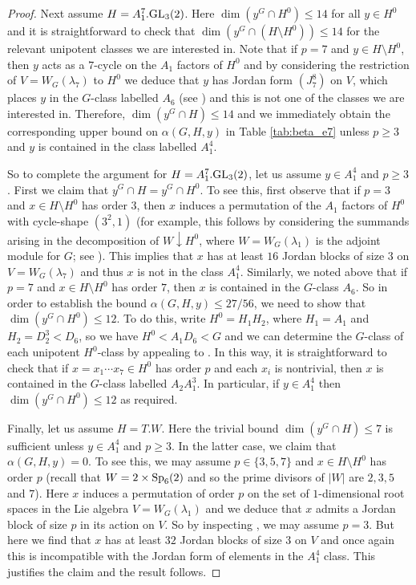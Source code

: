 \documentclass[twoside,a4paper,reqno,11pt]{amsart}
\renewcommand{\a}{\alpha}
\renewcommand{\l}{\lambda}
\newcommand{\<}{\langle}
\renewcommand{\>}{\rangle}
\newcommand{\leqs}{\leqslant}
\newcommand{\geqs}{\geqslant}
\renewcommand{\:}{\colon}
\theoremstyle{plain}
\theoremstyle{definition}
\begin{document}
\begin{proof}
Next assume $H = A_1^7.{\rm GL}_3(2)$. Here $\dim(y^G \cap H^0) \leqs 14$ for all $y \in H^0$ and it is straightforward to check that $\dim(y^G \cap (H\setminus H^0)) \leqs 14$ for the relevant unipotent classes we are interested in. Note that if $p=7$ and $y \in H \setminus H^0$, then $y$ acts as a $7$-cycle on the $A_1$ factors of $H^0$ and by considering the restriction of $V = W_G(\l_7)$ to $H^0$ we deduce that $y$ has Jordan form $(J_7^8)$ on $V$, which places $y$ in the $G$-class labelled $A_6$ (see \cite[Table 7]{Law1}) and this is not one of the classes we are interested in. Therefore, $\dim(y^G \cap H) \leqs 14$ and we immediately obtain  the corresponding upper bound on $\a(G,H,y)$ in Table \ref{tab:beta_e7} unless $p \geqs 3$ and $y$ is contained in the class labelled $A_1^4$. 

So to complete the argument for $H = A_1^7.{\rm GL}_3(2)$, let us assume $y \in A_1^4$ and $p \geqs 3$. First we claim that $y^G \cap H = y^G \cap H^0$. To see this, first observe that if $p=3$ and $x \in H \setminus H^0$ has order $3$, then $x$ induces a permutation of the $A_1$ factors of $H^0$ with cycle-shape $(3^2,1)$ (for example, this follows by considering the summands arising in the decomposition of $W \downarrow H^0$, where $W = W_G(\l_1)$ is the adjoint module for $G$; see \cite[Table 4]{Thomas}). This implies that  $x$ has at least $16$ Jordan blocks of size $3$ on $V = W_G(\l_7)$ and thus $x$ is not in the class $A_1^4$. Similarly, we noted above that if $p=7$ and $x \in H \setminus H^0$ has order $7$, then $x$ is contained in the $G$-class $A_6$. So in order to establish the bound $\a(G,H,y) \leqs 27/56$, we need to show that $\dim(y^G \cap H^0) \leqs 12$. To do this, write $H^0 = H_1H_2$, where $H_1 = A_1$ and $H_2 = D_2^3<D_6$, so we have $H^0 < A_1D_6 < G$ and we can determine the $G$-class of each unipotent $H^0$-class by appealing to \cite[Section 4.12]{Law2}. In this way, it is straightforward to check that if $x = x_1 \cdots x_7 \in H^0$ has order $p$ and each $x_i$ is nontrivial, then $x$ is contained in the $G$-class labelled $A_2A_1^3$. In particular, if $y \in A_1^4$ then $\dim(y^G \cap H^0) \leqs 12$ as required.

Finally, let us assume $H = T.W$. Here the trivial bound $\dim(y^G \cap H) \leqs 7$ is sufficient unless $y \in A_1^4$ and $p \geqs 3$. In the latter case, we claim that $\a(G,H,y) = 0$. To see this, we may assume $p \in \{3,5,7\}$ and $x \in H \setminus H^0$ has order $p$ (recall that $W = 2 \times {\rm Sp}_6(2)$ and so the prime divisors of $|W|$ are $2,3,5$ and $7$). Here $x$ induces a permutation of order $p$ on the set of $1$-dimensional root spaces in the Lie algebra $V = W_G(\l_1)$ and we deduce that $x$ admits a Jordan block of size $p$ in its action on $V$. So by inspecting \cite[Table 8]{Law1}, we may assume $p=3$. But here we find that $x$ has at least $32$ Jordan blocks of size $3$ on $V$ and once again this is incompatible with the Jordan form of elements in the $A_1^4$ class.  This justifies the claim and the result follows.
\end{proof}
\end{document}
